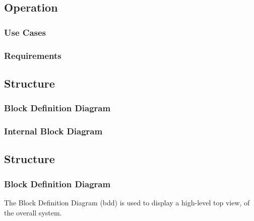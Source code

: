 


\subsection{Operation}

\blindtext %

\subsubsection{Use Cases}

\blindtext %

\subsubsection{Requirements}

\blindtext %




\subsection{Structure}

\blindtext %

\subsubsection{Block Definition Diagram}

\blindtext %

\subsubsection{Internal Block Diagram}

\blindtext %




\subsection{Structure}

\blindtext %

\subsubsection{Block Definition Diagram}
The Block Definition Diagram (bdd) is used to display a high-level top view, of the overall system.



